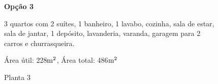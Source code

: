 \begin{figure}
\textbf{Opção 3}

	3 quartos com 2 suítes, 1 banheiro, 1 lavabo, cozinha, sala de estar, sala de jantar, 1 depósito, lavanderia, varanda, garagem para 2 carros e churrasqueira.
	
Área útil: 228$\textup{m}^{2}$, Área total: 486$\textup{m}^{2}$
\centering
\caption{Planta 3\cite{planta3}}

\end{figure}
\pagebreak